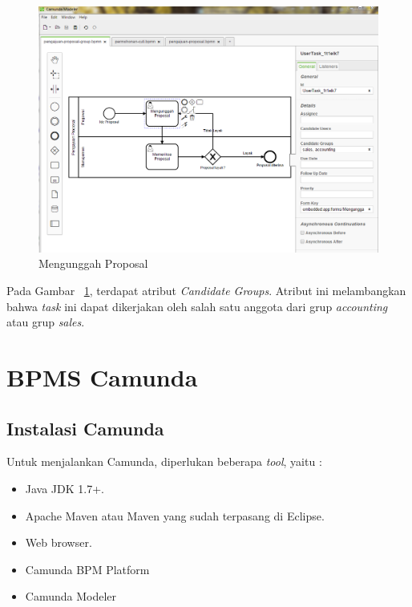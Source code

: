 		\begin{figure}[H]
			\centering
			\includegraphics[scale=0.5]{Gambar/Bab-3/Kasus2-1}
			\caption{Mengunggah Proposal} 
			\label{fig:mengunggahproposalgroup}
		\end{figure}
Pada Gambar ~\ref{fig:mengunggahproposalgroup}, terdapat atribut \textit{Candidate Groups}. Atribut ini melambangkan bahwa \textit{task} ini dapat dikerjakan oleh salah satu anggota dari grup \textit{accounting} atau grup \textit{sales}.


\section{BPMS Camunda}
\subsection{Instalasi Camunda}
\label{instalasicamunda}
Untuk menjalankan Camunda, diperlukan beberapa \textit{tool}\cite{bpmngetstarted:15:camunda}, yaitu :
\begin{itemize}
	\item Java JDK 1.7+.
	\item Apache Maven atau Maven yang sudah terpasang di Eclipse.
	\item Web browser.
	\item Camunda BPM Platform 
	\item Camunda Modeler
\end{itemize}



